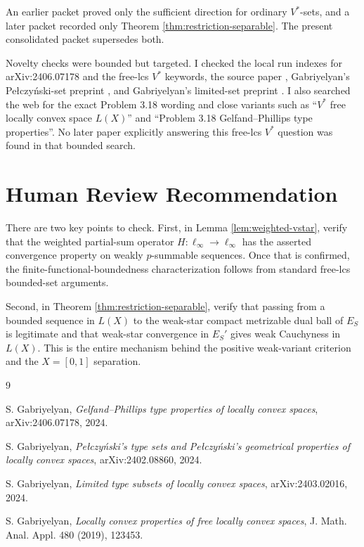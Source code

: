 \documentclass[11pt]{article}
\begin{document}
An earlier packet proved only the sufficient direction for ordinary
\(V^\ast\)-sets, and a later packet recorded only Theorem
\ref{thm:restriction-separable}. The present consolidated packet
supersedes both.

Novelty checks were bounded but targeted. I checked the local run indexes
for arXiv:2406.07178 and the free-lcs \(V^\ast\) keywords, the source
paper \cite{Gab2024GP}, Gabriyelyan's Pe{\l}czy\'nski-set preprint
\cite{Gab2024Pel}, and Gabriyelyan's limited-set preprint
\cite{Gab2024Limited}. I also searched the web for the exact Problem 3.18
wording and close variants such as ``\(V^\ast\) free locally convex
space \(L(X)\)'' and ``Problem 3.18 Gelfand--Phillips type properties''.
No later paper explicitly answering this free-lcs \(V^\ast\) question was
found in that bounded search.

\section*{Human Review Recommendation}

There are two key points to check. First, in Lemma
\ref{lem:weighted-vstar}, verify that the weighted partial-sum operator
\(H:\ell_\infty\to\ell_\infty\) has the asserted convergence property on
weakly \(p\)-summable sequences. Once that is confirmed, the
finite-functional-boundedness characterization follows from standard
free-lcs bounded-set arguments.

Second, in Theorem \ref{thm:restriction-separable}, verify that passing
from a bounded sequence in \(L(X)\) to the weak-star compact metrizable
dual ball of \(E_S\) is legitimate and that weak-star convergence in
\(E_S'\) gives weak Cauchyness in \(L(X)\). This is the entire mechanism
behind the positive weak-variant criterion and the \(X=[0,1]\) separation.

\begin{thebibliography}{9}

S. Gabriyelyan,
\emph{Gelfand--Phillips type properties of locally convex spaces},
arXiv:2406.07178, 2024.

S. Gabriyelyan,
\emph{Pe{\l}czy{\'n}ski's type sets and Pe{\l}czy{\'n}ski's geometrical
properties of locally convex spaces},
arXiv:2402.08860, 2024.

S. Gabriyelyan,
\emph{Limited type subsets of locally convex spaces},
arXiv:2403.02016, 2024.

S. Gabriyelyan,
\emph{Locally convex properties of free locally convex spaces},
J. Math. Anal. Appl. 480 (2019), 123453.

\end{thebibliography}
\end{document}
